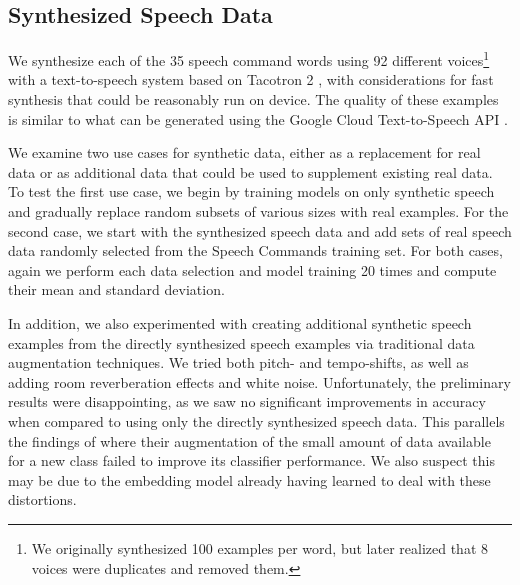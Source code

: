 \documentclass{article}
\begin{document}
\subsection{Synthesized Speech Data}
We synthesize each of the 35 speech command words using 92 different voices\footnote{We originally synthesized 100 examples per word, but later realized that 8 voices were duplicates and removed them.} with a text-to-speech system based on Tacotron 2 \cite{Shen_2018}, with considerations for fast synthesis that could be reasonably run on device. The quality of these examples is similar to what can be generated using the Google Cloud Text-to-Speech API \cite{cloudAPI}.

We examine two use cases for synthetic data, either as a replacement for real data or as additional data that could be used to supplement existing real data. To test the first use case, we begin by training models on only synthetic speech and gradually replace random subsets of various sizes with real examples. For the second case, we start with the synthesized speech data and add sets of real speech data randomly selected from the Speech Commands training set. For both cases, again we perform each data selection and model training 20 times and compute their mean and standard deviation.

In addition, we also experimented with creating additional synthetic speech examples from the directly synthesized speech examples via traditional data augmentation techniques. We tried both pitch- and tempo-shifts, as well as adding room reverberation effects and white noise. Unfortunately, the preliminary results were disappointing, as we saw no significant improvements in accuracy when compared to using only the directly synthesized speech data. This parallels the findings of \cite{qi2018low} where their augmentation of the small amount of data available for a new class failed to improve its classifier performance. We also suspect this may be due to the embedding model already having learned to deal with these distortions. 
\end{document}
